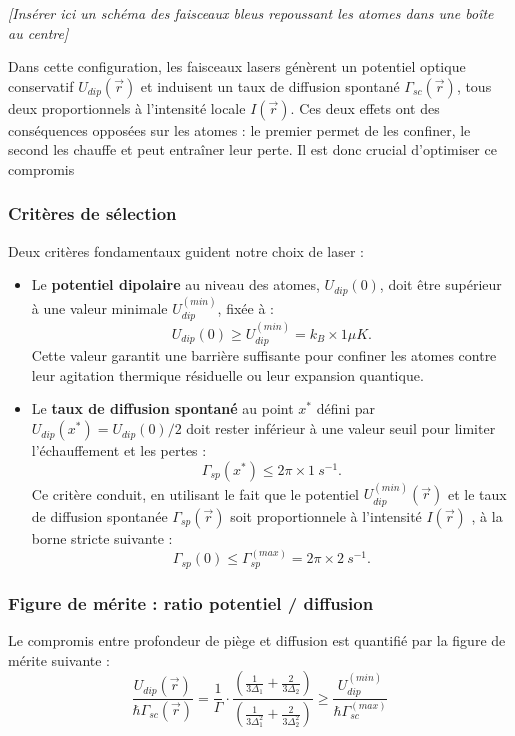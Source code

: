\begin{center}
\textit{[Insérer ici un schéma des faisceaux bleus repoussant les atomes dans une boîte au centre]}
\end{center}

\vspace{1em}

Dans cette configuration, les faisceaux lasers génèrent un potentiel optique conservatif $U_{dip}(\vec{r})$ et induisent un taux de diffusion spontané $\Gamma_{sc}(\vec{r})$, tous deux proportionnels à l’intensité locale $I(\vec{r})$. Ces deux effets ont des conséquences opposées sur les atomes : le premier permet de les confiner, le second les chauffe et peut entraîner leur perte. Il est donc crucial d’optimiser ce compromis

\subsubsection*{Critères de sélection}

Deux critères fondamentaux guident notre choix de laser :
\begin{itemize}
	\item Le {\bf potentiel dipolaire} au niveau des atomes, $U_{dip}(0)$, doit être supérieur à une valeur minimale $U_{dip}^{(min)}$, fixée à :
		\[
			U_{dip}(0)  \geq U_{dip}^{(min)} = k_B \times 1 \mu K.
		\]
		Cette valeur garantit une barrière suffisante pour confiner les atomes contre leur agitation thermique résiduelle ou leur expansion quantique.
	\item Le {\bf taux de diffusion spontané}  au point $x^\ast$ défini par $U_{dip}(x^\ast) = U_{dip}(0)/2$ doit rester inférieur à une valeur seuil pour limiter l’échauffement et les pertes :
		\[
			\Gamma_{sp}(x^\ast) \leq 2\pi \times 1~s^{-1}.
		\]
		Ce critère conduit, en utilisant le fait que le potentiel $U_{dip}^{(min)}(\vec{r})$ et le taux de diffusion spontanée $\Gamma_{sp}(\vec{r})$ soit proportionnele à l’intensité $I(\vec{r})$ , à la borne stricte suivante :
		\[
			\Gamma_{sp}(0) \leq \Gamma_{sp}^{(max)} = 2\pi \times 2~s^{-1}.
		\]
\end{itemize}

\subsubsection*{Figure de mérite : ratio potentiel / diffusion}

Le compromis entre profondeur de piège et diffusion est quantifié par la figure de mérite suivante :
\begin{equation}
\frac{U_{dip}(\vec{r})}{\hbar \Gamma_{sc}(\vec{r})} = \frac{1}{\Gamma} \cdot \frac{ \left( \frac{1}{3\Delta_1} + \frac{2}{3\Delta_2} \right)}{\left( \frac{1}{3\Delta_1^2} + \frac{2}{3\Delta_2^2} \right)} \geq \frac{U_{dip}^{(min)}}{\hbar \Gamma_{sc}^{(max)}}
\end{equation}

